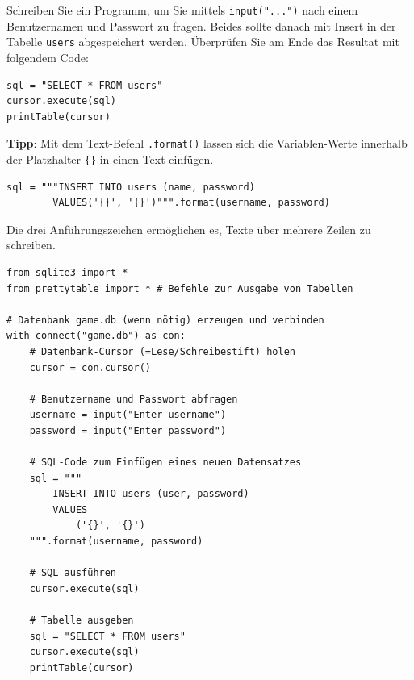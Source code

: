\begin{myexercise}
Schreiben Sie ein Programm, um Sie mittels \lstinline|input("...")| nach einem Benutzernamen und Passwort zu fragen. Beides sollte danach mit Insert in der Tabelle \texttt{users} abgespeichert werden. Überprüfen Sie am Ende das Resultat mit folgendem Code:
\begin{lstlisting}
sql = "SELECT * FROM users"
cursor.execute(sql)
printTable(cursor)
\end{lstlisting}
\textbf{Tipp}: Mit dem Text-Befehl \lstinline|.format()| lassen sich die Variablen-Werte innerhalb der Platzhalter \lstinline|{}| in einen Text einfügen.

\begin{lstlisting}
sql = """INSERT INTO users (name, password)
        VALUES('{}', '{}')""".format(username, password)
\end{lstlisting}
Die drei Anführungszeichen ermöglichen es, Texte über mehrere Zeilen zu schreiben.
\begin{myanswer}
\begin{lstlisting}
from sqlite3 import *
from prettytable import * # Befehle zur Ausgabe von Tabellen

# Datenbank game.db (wenn nötig) erzeugen und verbinden
with connect("game.db") as con:
    # Datenbank-Cursor (=Lese/Schreibestift) holen
    cursor = con.cursor()
    
    # Benutzername und Passwort abfragen
    username = input("Enter username")
    password = input("Enter password")
    
    # SQL-Code zum Einfügen eines neuen Datensatzes
    sql = """
        INSERT INTO users (user, password)
        VALUES
            ('{}', '{}')
    """.format(username, password)
    
    # SQL ausführen
    cursor.execute(sql)
    
    # Tabelle ausgeben
    sql = "SELECT * FROM users"    
    cursor.execute(sql)
    printTable(cursor)

\end{lstlisting}
\end{myanswer}
\end{myexercise}

